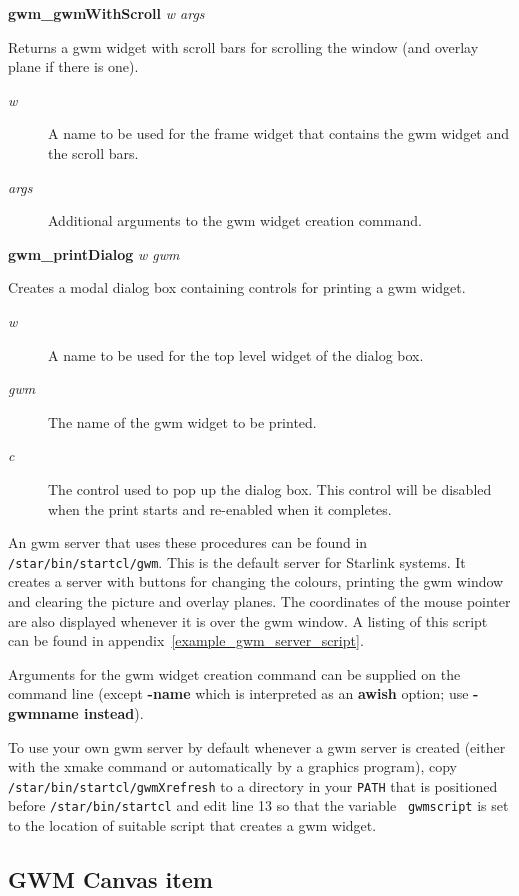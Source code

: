 {\bf gwm\_gwmWithScroll} {\em w args}
\begin{rquote}
Returns a gwm widget with scroll bars for scrolling the window (and  overlay
plane if there is one).
\begin{description}
\item[{\em w}] A name to be used for the frame widget that contains the gwm
widget and the scroll bars.
\item[{\em args}] Additional arguments to the gwm widget creation command.
\end{description}
\end{rquote}

{\bf gwm\_printDialog} {\em w gwm}
\begin{rquote}
Creates a modal dialog box containing controls for printing a gwm widget.
\begin{description}
\item[{\em w}] A name to be used for the top level widget of the dialog box.
\item[{\em gwm}] The name of the gwm widget to be printed.
\item[{\em c}] The control used to pop up the dialog box. This control will
be disabled when the print starts and re-enabled when it completes.
\end{description}
\end{rquote}

An gwm server that uses these procedures can be found in
{\tt{/star/bin/startcl/gwm}}.  This is the default server for Starlink
systems.  It creates a server with buttons for changing the colours,
printing the gwm window and clearing the picture and overlay planes.
The coordinates of the mouse pointer are also displayed whenever it is
over the gwm window.  A listing of this script can be found in
appendix~\ref{example_gwm_server_script}.

Arguments for the gwm widget creation command can be supplied on the command
line (except {\bf -name} which is interpreted as an {\bf awish} option; use
{\bf -gwmname instead}). 

To use your own gwm server by default whenever a gwm server
is created (either with the xmake command or automatically by a
graphics program), copy {\tt{/star/bin/startcl/gwmXrefresh}} to a
directory in your {\tt{PATH}} that is positioned before
{\tt{/star/bin/startcl}} and edit line 13 so that the variable {\tt
gwmscript} is set to the location of suitable script that creates a gwm
widget.

\subsection{\label{gwm_canvas_item}GWM Canvas item}

